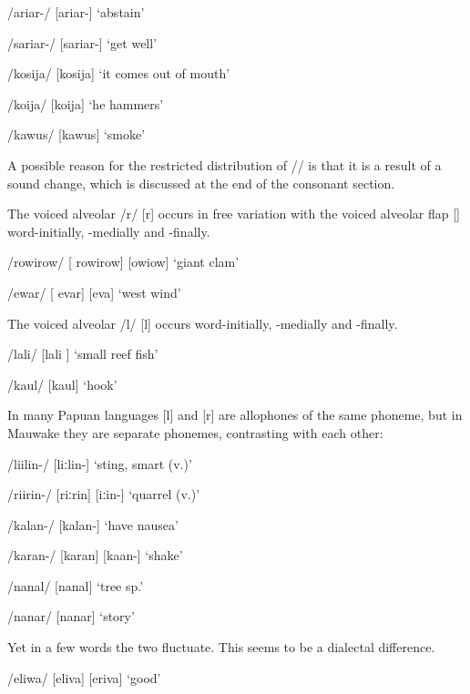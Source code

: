 /{\textphi}ariar-/  [{\textphi}a{{\textprimstress}riar}-]  `abstain'

/sariar-/  [sa{{\textprimstress}riar}-]  `get well'

/kosija/  [ko{{\textprimstress}sija}]  `it comes out of mouth'

/ko{\textphi}ija/  [ko{{\textprimstress}}{\textphi}ija]  `he hammers'

/kawus/  [ka{{\textprimstress}wus}]  `smoke'

A possible reason for the restricted distribution of /{\textphi}/ is that it is a result of a sound change, which is discussed at the end of the consonant section.

The voiced alveolar  /r/ [r] occurs in free variation with the voiced alveolar flap [{\textfishhookr}] word-initially, -medially and -finally.  

/rowirow/  [ ro{{\textprimstress}wirow}] {\Tilde} [{\textfishhookr}o{{\textprimstress}wi}{\textfishhookr}ow]  `giant clam'

/ewar/  [ e{{\textprimstress}var}] {\Tilde} [e{{\textprimstress}va}{\textfishhookr}]  `west wind'

The voiced alveolar  /l/ [l] occurs word-initially, -medially and -finally. 

/lali/  [la{{\textprimstress}li} ]  `small reef fish'

/kaul/  [{{\textprimstress}kaul}]  `hook'

In many Papuan languages [l] and [r] are allophones of the same phoneme, but in Mauwake they are separate phonemes, contrasting with each other:

/liilin-/  [liːlin-]  `sting, smart (v.)'

/riirin-/  [{{\textprimstress}riːrin}] {\Tilde} [{{\textprimstress}}{\textfishhookr}iː{\textfishhookr}in-]  `quarrel (v.)'

/kalan-/  [ka{{\textprimstress}lan}-]  `have nausea' 

/karan-/  [ka{{\textprimstress}ran}] {\Tilde} [ka{{\textprimstress}}{\textfishhookr}an-]  `shake'

/nanal/  [na{{\textprimstress}nal}]  `tree sp.'

/nanar/  [na{{\textprimstress}nar}]  `story'

Yet in a few words the two fluctuate. This seems to be a dialectal difference.

/eliwa/  [e{{\textprimstress}liva}] {\Tilde} [e{{\textprimstress}riva}]  `good'

